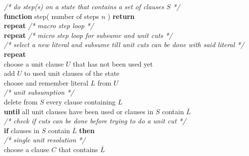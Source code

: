 \begin{listing}[h!]
    \textit{/* do step(s) on a state that contains a set of clauses $S$ */}\\
    \textbf{function} step( number of steps $n$ ) \textbf{return}\\
        \hspace*{0.5cm} \textbf{repeat} \textit{/* macro step loop */}\\
            \hspace*{1.0cm} \textbf{repeat} \textit{/* micro step loop for subsume and unit cuts */}\\
                \hspace*{1.5cm} \textit{/* select a new literal and subsume till unit cuts can be done with said literal */}\\
                \hspace*{1.5cm} \textbf{repeat}\\
                    \hspace*{2cm} choose a unit clause $U$ that has not been used yet\\
                    \hspace*{2cm} add $U$ to used unit clauses of the state\\
                    \hspace*{2cm} choose and remember literal $L$ from $U$\\
                    \hspace*{2cm} \textit{/* unit subsumption */}\\
                    \hspace*{2cm} delete from $S$ every clause containing $L$\\
                \hspace*{1.5cm} \textbf{until} all unit clauses have been used or clauses in $S$ contain $\bar{L}$\\
                \hspace*{1.5cm} \textit{/* check if cuts can be done before trying to do a unit cut */}\\
                \hspace*{1.5cm} \textbf{if} clauses in $S$ contain $\bar{L}$ \textbf{then}\\
                    \hspace*{1.5cm} \textit{/* single unit resolution */}\\
                    \hspace*{2cm} choose a clause $C$ that contains $\bar{L}$\\

\end{listing}
